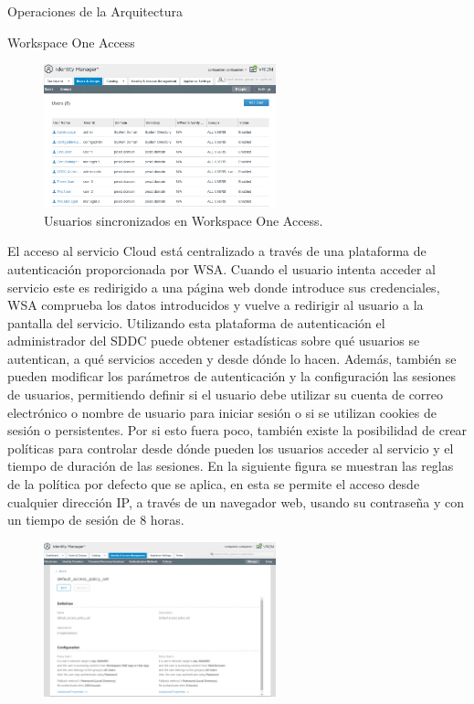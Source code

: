 \begin{subsection}{Operaciones de la Arquitectura}
\begin{subsubsection}{Workspace One Access}
\begin{figure}[h]
            \centering
            \includegraphics[width=0.6\textwidth]{imaxes/pruebaconcepto/vrealize/users-wsa.png}
            \caption{Usuarios sincronizados en Workspace One Access.}
            \label{fig:users-defined-WSA}
        \end{figure}
        \FloatBarrier
        El acceso al servicio Cloud está centralizado a través de una plataforma de autenticación proporcionada por WSA. Cuando el usuario intenta acceder al servicio este es redirigido a una página web donde introduce sus credenciales, WSA comprueba los datos introducidos y vuelve a redirigir al usuario a la pantalla del servicio. Utilizando esta plataforma  de autenticación el administrador del SDDC puede obtener estadísticas sobre qué usuarios se autentican, a qué servicios acceden y desde dónde lo hacen. Además, también se pueden  modificar los parámetros de autenticación y la configuración las sesiones de usuarios, permitiendo definir si el usuario debe utilizar su cuenta de correo electrónico o nombre de usuario para iniciar sesión o si se utilizan cookies de sesión o persistentes. Por si esto fuera poco, también existe la posibilidad de crear políticas para controlar desde dónde pueden los usuarios acceder al servicio y el tiempo de duración de las sesiones. En la siguiente figura se muestran las reglas de la política por defecto que se aplica, en esta se permite el acceso desde cualquier dirección IP, a través de un navegador web, usando su contraseña y con un tiempo de sesión de 8 horas.
        \begin{figure}[h]
            \centering
            \includegraphics[width=0.6\textwidth]{imaxes/pruebaconcepto/vrealize/default-policy.png}

\end{figure}
\end{subsubsection}
\end{subsection}
